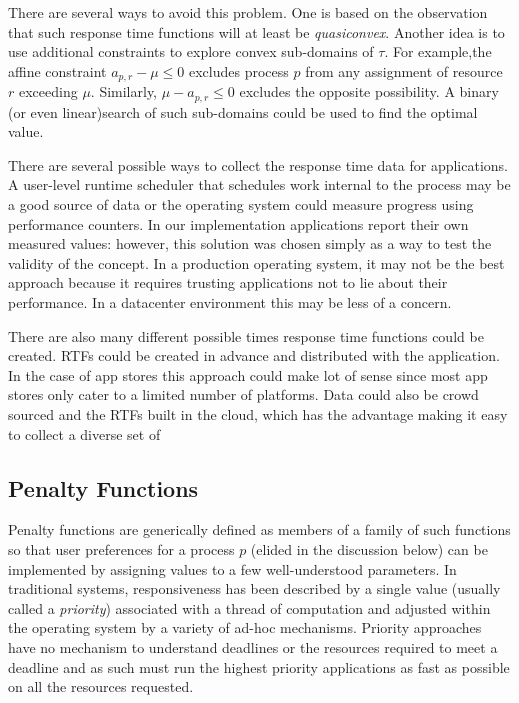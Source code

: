 There are several ways to avoid this problem.  One is based on the observation that such response time functions will at least be \emph{quasiconvex}.  Another idea is to use additional constraints to explore convex sub-domains of $\tau$. For example,the affine constraint $a_{p,r} - \mu \leq 0$ excludes process $p$ from any assignment of resource $r$ exceeding $\mu$.  Similarly, $\mu - a_{p,r} \leq 0$ excludes the opposite possibility.
A binary (or even linear)search of such sub-domains could be used to find the optimal value.

There are several possible ways to collect the response time data for applications. A user-level runtime scheduler that schedules work internal to the process may be a good source of data or the operating system could measure progress using performance counters.  In our implementation applications report their own measured values: however, this solution was chosen simply as a way to test the validity of the concept.  In a production operating system, it may not be the best approach because it requires trusting applications not to lie about their performance.  In a datacenter environment this may be less of a concern. 

There are also many different possible times response time functions could be created.  RTFs could be created in advance and distributed with the application. In the case of app stores this approach could make lot of sense since most app stores only cater to a limited number of platforms. Data could also be crowd sourced and the RTFs built in the cloud, which has the advantage making it easy to collect a diverse set of 

\subsection*{Penalty Functions}

Penalty functions  are generically defined as members of a family of such functions
so that user preferences for a process $p$ (elided in the discussion below)
can be implemented by assigning values to a few well-understood parameters.
In traditional systems, responsiveness has been described by a single value (usually called a \emph{priority}) associated with a thread of computation and adjusted within the operating system by a variety of ad-hoc mechanisms.   Priority approaches have no mechanism to understand deadlines or the resources required to meet a deadline and as such must run the highest priority applications as fast as possible on all the resources requested. 

